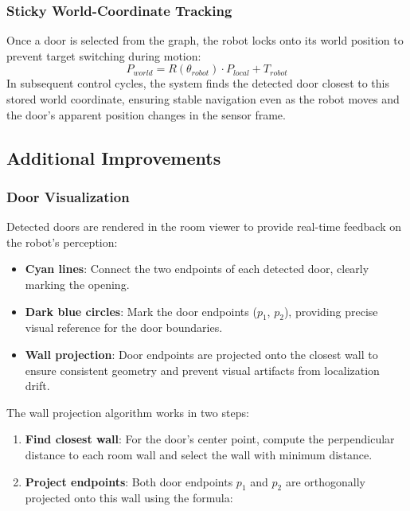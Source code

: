 \documentclass[conference]{IEEEtran}
\begin{document}
    \subsubsection{\textbf{Sticky World-Coordinate Tracking}}
    Once a door is selected from the graph, the robot locks onto its world position to prevent target switching during motion:
    \begin{equation}
        P_{world} = R(\theta_{robot}) \cdot P_{local} + T_{robot}
    \end{equation}
    In subsequent control cycles, the system finds the detected door closest to this stored world coordinate, ensuring stable navigation even as the robot moves and the door's apparent position changes in the sensor frame.

    \subsection{Additional Improvements}

    \subsubsection{\textbf{Door Visualization}}
    Detected doors are rendered in the room viewer to provide real-time feedback on the robot's perception:
    \begin{itemize}
        \item \textbf{Cyan lines}: Connect the two endpoints of each detected door, clearly marking the opening.
        \item \textbf{Dark blue circles}: Mark the door endpoints ($p_1$, $p_2$), providing precise visual reference for the door boundaries.
        \item \textbf{Wall projection}: Door endpoints are projected onto the closest wall to ensure consistent geometry and prevent visual artifacts from localization drift.
    \end{itemize}

    The wall projection algorithm works in two steps:
    \begin{enumerate}
        \item \textbf{Find closest wall}: For the door's center point, compute the perpendicular distance to each room wall and select the wall with minimum distance.
        \item \textbf{Project endpoints}: Both door endpoints $p_1$ and $p_2$ are orthogonally projected onto this wall using the formula:
    \end{enumerate}
\end{document}
